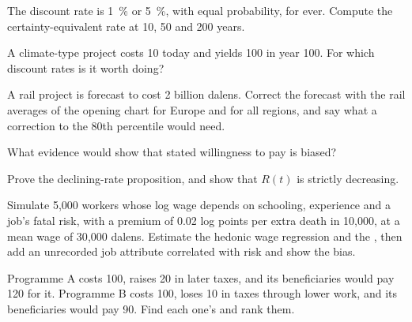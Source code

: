 \begin{exercise}[$\star\star$]\label{exo:b3:cost-benefit-analysis:6}
The discount rate is 1~\% or 5~\%, with equal probability, for ever. Compute the
certainty-equivalent rate at 10, 50 and 200 years.
\end{exercise}

\begin{exercise}[$\star\star$]\label{exo:b3:cost-benefit-analysis:7}
A climate-type project costs 10 today and yields 100 in year 100. For which discount
rates is it worth doing?
\end{exercise}

\begin{exercise}[$\star\star$]\label{exo:b3:cost-benefit-analysis:8}
A rail project is forecast to cost 2 billion dalens. Correct the forecast with the
rail averages of the opening chart for Europe and for all regions, and say what a
correction to the 80th percentile would need.
\end{exercise}

\begin{exercise}[$\star\star$]\label{exo:b3:cost-benefit-analysis:9}
What evidence would show that stated willingness to pay is biased?
\end{exercise}

\begin{exercise}[$\star\star\star$]\label{exo:b3:cost-benefit-analysis:10}
Prove the declining-rate proposition, and show that $R(t)$ is strictly decreasing.
\end{exercise}

\begin{exercise}[$\star\star\star$]\label{exo:b3:cost-benefit-analysis:11}
Simulate 5{,}000 workers whose log wage depends on schooling, experience and a job's
fatal risk, with a premium of 0.02 log points per extra death in 10{,}000, at a mean
wage of 30{,}000 dalens. Estimate the hedonic wage regression and the , then add an unrecorded job attribute correlated with risk and
show the bias.
\end{exercise}

\begin{exercise}[$\star\star\star$]\label{exo:b3:cost-benefit-analysis:12}
Programme A costs 100, raises 20 in later taxes, and its beneficiaries would pay 120
for it. Programme B costs 100, loses 10 in taxes through lower work, and its
beneficiaries would pay 90. Find each one's  and rank
them.
\end{exercise}

